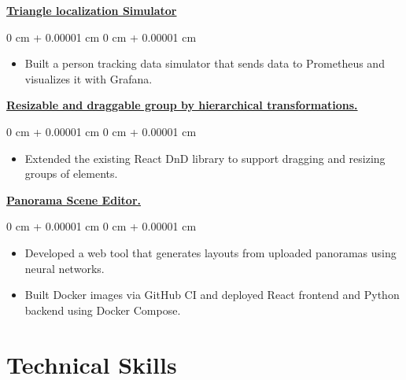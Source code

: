 \documentclass[10pt, letterpaper]{article}
\newenvironment{highlights}{
    \begin{itemize}[
        topsep=0.10 cm,
        parsep=0.10 cm,
        partopsep=0pt,
        itemsep=0pt,
        leftmargin=0 cm + 10pt
    ]
}{
    \end{itemize}
} %
\newenvironment{onecolentry}{
    \begin{adjustwidth}{
        0 cm + 0.00001 cm
    }{
        0 cm + 0.00001 cm
    }
}{
    \end{adjustwidth}
} %
\begin{document}
        \vspace{0.2 cm}

        \href{https://github.com/tsengyushiang/triangle-localization-simulator}{\textbf{Triangle localization Simulator}}
        \vspace{0.10 cm}
        \begin{onecolentry}
            \begin{highlights}
                \item Built a person tracking data simulator that sends data to Prometheus and visualizes it with Grafana.
            \end{highlights}
        \end{onecolentry}

        \vspace{0.2 cm}

        \href{https://github.com/tsengyushiang/react-rnd-group}{\textbf{Resizable and draggable group by hierarchical transformations.}}
        \vspace{0.10 cm}
        \begin{onecolentry}
            \begin{highlights}
                \item Extended the existing React DnD library to support dragging and resizing groups of elements.
            \end{highlights}
        \end{onecolentry}

        \vspace{0.2 cm}

        \href{https://github.com/tsengyushiang/pano-to-mesh}{\textbf{Panorama Scene Editor.}}
        \vspace{0.10 cm}
        \begin{onecolentry}
            \begin{highlights}
                \item Developed a web tool that generates layouts from uploaded panoramas using neural networks.
                \item Built Docker images via GitHub CI and deployed React frontend and Python backend using Docker Compose.
            \end{highlights}
        \end{onecolentry}
        

    \section{Technical Skills}
\end{document}
